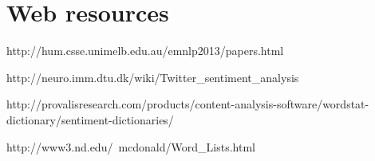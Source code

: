 \chapter{Web resources}

http://hum.csse.unimelb.edu.au/emnlp2013/papers.html

http://neuro.imm.dtu.dk/wiki/Twitter_sentiment_analysis

http://provalisresearch.com/products/content-analysis-software/wordstat-dictionary/sentiment-dictionaries/

http://www3.nd.edu/~mcdonald/Word_Lists.html



